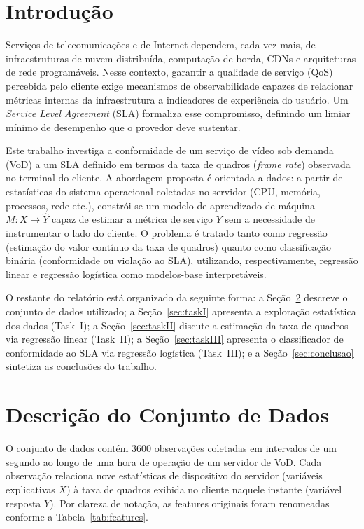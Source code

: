 \documentclass[11pt,a4paper]{article}
\begin{document}
\tableofcontents
\newpage


\section{Introdução}


Serviços de telecomunicações e de Internet dependem, cada vez mais, de infraestruturas de nuvem distribuída, computação de borda, CDNs e arquiteturas de rede programáveis. Nesse contexto, garantir a qualidade de serviço (QoS) percebida pelo cliente exige mecanismos de observabilidade capazes de relacionar métricas internas da infraestrutura a indicadores de experiência do usuário. Um \emph{Service Level Agreement} (SLA) formaliza esse compromisso, definindo um limiar mínimo de desempenho que o provedor deve sustentar.

Este trabalho investiga a conformidade de um serviço de vídeo sob demanda (VoD) a um SLA definido em termos da taxa de quadros (\emph{frame rate}) observada no terminal do cliente. A abordagem proposta é orientada a dados: a partir de estatísticas do sistema operacional coletadas no servidor (CPU, memória, processos, rede etc.), constrói-se um modelo de aprendizado de máquina $M: X \rightarrow \hat{Y}$ capaz de estimar a métrica de serviço $Y$ sem a necessidade de instrumentar o lado do cliente. O problema é tratado tanto como regressão (estimação do valor contínuo da taxa de quadros) quanto como classificação binária (conformidade ou violação ao SLA), utilizando, respectivamente, regressão linear e regressão logística como modelos-base interpretáveis.

O restante do relatório está organizado da seguinte forma: a Seção~\ref{sec:dataset} descreve o conjunto de dados utilizado; a Seção~\ref{sec:taskI} apresenta a exploração estatística dos dados (Task~I); a Seção~\ref{sec:taskII} discute a estimação da taxa de quadros via regressão linear (Task~II); a Seção~\ref{sec:taskIII} apresenta o classificador de conformidade ao SLA via regressão logística (Task~III); e a Seção~\ref{sec:conclusao} sintetiza as conclusões do trabalho.


\section{Descrição do Conjunto de Dados}
\label{sec:dataset}


O conjunto de dados contém 3600 observações coletadas em intervalos de um segundo ao longo de uma hora de operação de um servidor de VoD. Cada observação relaciona nove estatísticas de dispositivo do servidor (variáveis explicativas $X$) à taxa de quadros exibida no cliente naquele instante (variável resposta $Y$). Por clareza de notação, as features originais foram renomeadas conforme a Tabela~\ref{tab:features}.
\end{document}
